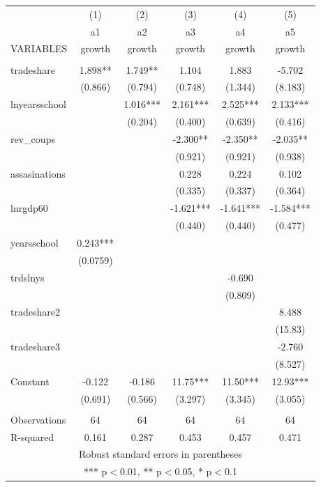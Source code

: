 \documentclass[]{article}
\begin{document}
\begin{tabular}{lccccc} \hline
 & (1) & (2) & (3) & (4) & (5) \\
 & a1 & a2 & a3 & a4 & a5 \\
VARIABLES & growth & growth & growth & growth & growth \\ \hline
 &  &  &  &  &  \\
tradeshare & 1.898** & 1.749** & 1.104 & 1.883 & -5.702 \\
 & (0.866) & (0.794) & (0.748) & (1.344) & (8.183) \\
lnyearsschool &  & 1.016*** & 2.161*** & 2.525*** & 2.133*** \\
 &  & (0.204) & (0.400) & (0.639) & (0.416) \\
rev\_coups &  &  & -2.300** & -2.350** & -2.035** \\
 &  &  & (0.921) & (0.921) & (0.938) \\
assasinations &  &  & 0.228 & 0.224 & 0.102 \\
 &  &  & (0.335) & (0.337) & (0.364) \\
lnrgdp60 &  &  & -1.621*** & -1.641*** & -1.584*** \\
 &  &  & (0.440) & (0.440) & (0.477) \\
yearsschool & 0.243*** &  &  &  &  \\
 & (0.0759) &  &  &  &  \\
trdslnys &  &  &  & -0.690 &  \\
 &  &  &  & (0.809) &  \\
tradeshare2 &  &  &  &  & 8.488 \\
 &  &  &  &  & (15.83) \\
tradeshare3 &  &  &  &  & -2.760 \\
 &  &  &  &  & (8.527) \\
Constant & -0.122 & -0.186 & 11.75*** & 11.50*** & 12.93*** \\
 & (0.691) & (0.566) & (3.297) & (3.345) & (3.055) \\
 &  &  &  &  &  \\
Observations & 64 & 64 & 64 & 64 & 64 \\
 R-squared & 0.161 & 0.287 & 0.453 & 0.457 & 0.471 \\ \hline
\multicolumn{6}{c}{ Robust standard errors in parentheses} \\
\multicolumn{6}{c}{ *** p$<$0.01, ** p$<$0.05, * p$<$0.1} \\
\end{tabular}
\end{document}
